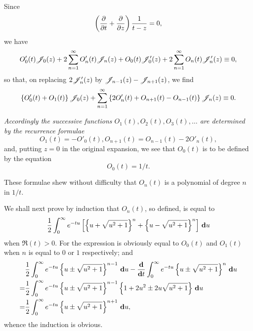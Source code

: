 Since
$$
\left( 
  \frac{\partial}{\partial t}
  +
  \frac{\partial}{\partial z}
 \right)
\frac{1}{t-z}
=
0,
$$
we have
$$
O'_{0}(t) \mathscr{J}_{0}(z)
+
2 \sum_{n=1}^{\infty}
O'_{n}(t) \mathscr{J}_{n}(z)
+
O_{0}(t) \mathscr{J}'_{0}(z)
+
2 \sum_{n=1}^{\infty}
O_{n}(t) \mathscr{J}'_{n}(z)
\equiv
0,
$$
so that, on replacing $2\mathscr{J}'_{n}(z)$ by
$\mathscr{J}_{n-1}(z) - \mathscr{J}_{n+1}(z)$, we find
$$
\left\{  O'_{0}(t) + O_{1}(t)  \right\} \mathscr{J}_{0}(z)
+
\sum_{n=1}^{\infty}
\left\{  2 O'_{n}(t) + O_{n+1}(t) - O_{n-1}(t)   \right\}
\mathscr{J}_{n}(z)
\equiv
0.
$$

%
%
\emph{Accordingly the successive functions $O_{1}(t), O_{2}(t), O_{3}(t),
  \ldots$ are determined by the recurrence formulae}
$$
O_{1}(t) = -O'_{0}(t),
O_{n+1}(t) = O_{n-1}(t) - 2O'_{n}(t),
$$
and, putting $z=0$ in the original expansion, we see that $O_{0}(t)$ is
to be defined by the equation
$$
O_{0}(t) = 1/t.
$$

These formulae shew without difficulty that $O_{n}(t)$ is a polynomial
of degree $n$ in $1/t$.

We shall next prove by induction that $O_{n}(t)$, so defined, is equal
to
$$
\frac{1}{2}
\int_{0}^{\infty}
e^{-tu}
\left[ 
  \left\{ u + \sqrt{u^{2}+1} \right\}^{n}
  +
  \left\{ u - \sqrt{u^{2}+1} \right\}^{n}
 \right]
\, \mathbf{d} u
$$
when $\Re(t) > 0$.
For the expression is obviously equal to $O_{0}(t)$ and $O_{1}(t)$ when
$n$ is equal to $0$ or $1$ respectively; and
\begin{align*}
  &
  \frac{1}{2}
  \int_{0}^{\infty}
  e^{-tu}
  \left\{ u \pm \sqrt{u^{2}+1} \right\}^{n-1}
  \, \mathbf{d} u
  -
  \frac{\mathbf{d}}{\mathbf{d} t}
  \int_{0}^{\infty}
  e^{-tu}
  \left\{ u \pm \sqrt{u^{2}+1} \right\}^{n}
  \, \mathbf{d} u
  \\
  =
  &
  \frac{1}{2}
  \int_{0}^{\infty}
  e^{-tu}
  \left\{ u \pm \sqrt{u^{2}+1} \right\}^{n-1}
  \left\{ 1 + 2u^{2} \pm 2u \sqrt{u^{2}+1} \right\}
  \, \mathbf{d} u
  \\
  =
  &
  \frac{1}{2}
  \int_{0}^{\infty}
  e^{-tu}
  \left\{ u \pm \sqrt{u^{2}+1} \right\}^{n+1}
  \, \mathbf{d} u,
\end{align*}
whence the induction is obvious.

